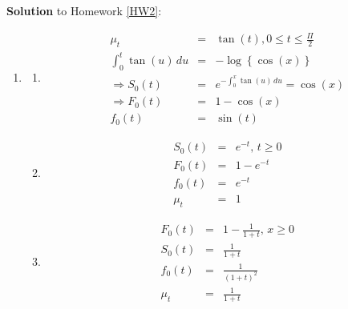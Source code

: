 \documentclass[11pt,fleqn,oneside]{book}
\begin{document}
\noindent \textbf{Solution} to Homework \ref{HW2}:
\footnotesize  
\begin{enumerate}
\item
\begin{enumerate}
\item 
\begin{eqnarray*}
\mu_t &=& \tan(t), 0 \leq t \leq \frac{\Pi}{2}\\
\int_0^t \tan(u)\,du &=& -\log\left\{\cos(x)\right\} \\
\Rightarrow S_0(t) &=& e^{-\int_0^x \tan(u)\,du} = \cos(x) \\
\Rightarrow F_0(t) &=& 1- \cos(x) \\
f_0(t) &=& \sin(t)
\end{eqnarray*}
\item
\begin{eqnarray*}
S_0(t) &=& e^{-t},\,t \geq 0 \\
F_0(t) &=& 1 - e^{-t} \\
f_0(t) &=& e^{-t} \\
\mu_t &=& 1
\end{eqnarray*}
\item
\begin{eqnarray*}
F_0(t) &=& 1 - \frac{1}{1+t},\,x \geq 0 \\
S_0(t) &=& \frac{1}{1+t} \\
f_0(t) &=& \frac{1}{(1+t)^2}  \\
\mu_t &=& \frac{1}{1+t} 
\end{eqnarray*}
\end{enumerate}



\end{enumerate}
\end{document}

